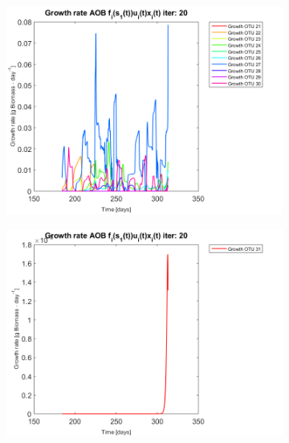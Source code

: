 \documentclass[3p,times]{article}
\begin{document}
\begin{figure}[h]
	\begin{subfigure}{0.45 \textwidth}
		\includegraphics[width =\textwidth]{Application//200407_iter_20_growth_control_AOB_plot_3}
	\end{subfigure}
	\begin{subfigure}{0.45 \textwidth}
		\includegraphics[width =\textwidth]{Application//200407_iter_20_growth_control_AOB_plot_4}
	\end{subfigure}
	\begin{subfigure}{0.45 \textwidth}

\end{subfigure}
\end{figure}
\end{document}
